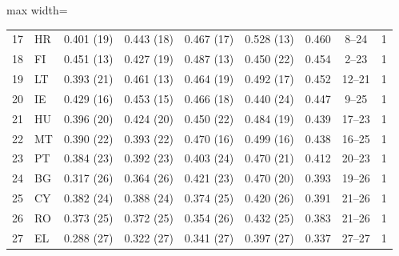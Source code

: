 \begin{table}[pos=t]
\begin{adjustbox}{max width=\linewidth}
\begin{tabular}{@{}rlccccccc@{}}
17 & HR & 0.401 (19) & 0.443 (18) & 0.467 (17) & 0.528 (13) & 0.460 & 8--24 & 1 \\
18 & FI & 0.451 (13) & 0.427 (19) & 0.487 (13) & 0.450 (22) & 0.454 & 2--23 & 1 \\
19 & LT & 0.393 (21) & 0.461 (13) & 0.464 (19) & 0.492 (17) & 0.452 & 12--21 & 1 \\
20 & IE & 0.429 (16) & 0.453 (15) & 0.466 (18) & 0.440 (24) & 0.447 & 9--25 & 1 \\
21 & HU & 0.396 (20) & 0.424 (20) & 0.450 (22) & 0.484 (19) & 0.439 & 17--23 & 1 \\
22 & MT & 0.390 (22) & 0.393 (22) & 0.470 (16) & 0.499 (16) & 0.438 & 16--25 & 1 \\
23 & PT & 0.384 (23) & 0.392 (23) & 0.403 (24) & 0.470 (21) & 0.412 & 20--23 & 1 \\
24 & BG & 0.317 (26) & 0.364 (26) & 0.421 (23) & 0.470 (20) & 0.393 & 19--26 & 1 \\
25 & CY & 0.382 (24) & 0.388 (24) & 0.374 (25) & 0.420 (26) & 0.391 & 21--26 & 1 \\
26 & RO & 0.373 (25) & 0.372 (25) & 0.354 (26) & 0.432 (25) & 0.383 & 21--26 & 1 \\
27 & EL & 0.288 (27) & 0.322 (27) & 0.341 (27) & 0.397 (27) & 0.337 & 27--27 & 1 \\
\bottomrule\end{tabular}\end{adjustbox}\end{table}
